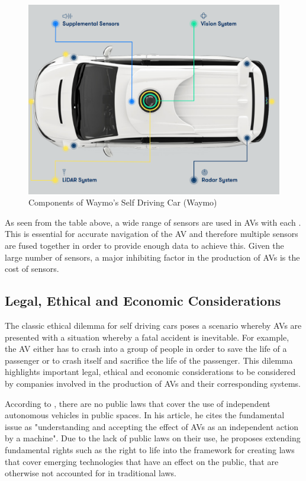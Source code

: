 \begin{figure}[t]
	\centering
	\includegraphics[width=\textwidth]{media/waymo.png}
	\caption{Components of Waymo's Self Driving Car (Waymo)}
	\label{fig:my_label}
\end{figure}

As seen from the table above, a wide range of sensors are used in AVs with each . This is essential for accurate navigation of the AV and therefore multiple sensors are fused together in order to provide enough data to achieve this. Given the large number of sensors, a major inhibiting factor in the production of AVs is the cost of sensors.



\subsection{Legal, Ethical and Economic Considerations}

The classic ethical dilemma for self driving cars poses a scenario whereby AVs are presented with a situation whereby a fatal accident is inevitable. For example, the AV either has to crash into a group of people in order to save the life of a passenger or to crash itself and sacrifice the life of the passenger. This dilemma highlights important legal, ethical and economic considerations to be considered by companies involved in the production of AVs and their corresponding systems. 




According to \cite{gasser2016fundamental}, there are no public laws that cover the  use of independent autonomous vehicles in public spaces. In his article, he cites the fundamental issue as "understanding and accepting the effect of AVs as an independent action by a machine". Due to the lack of public laws on their use, he proposes extending fundamental rights such as the right to life into the framework for creating laws that cover emerging technologies that have an effect on the public, that are otherwise not accounted for in traditional laws. 


